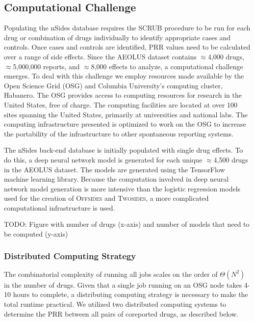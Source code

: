 \documentclass{ws-procs11x85}
\begin{document}
\subsection{Computational Challenge}

Populating the nSides database requires the SCRUB procedure to be run
for each drug or combination of drugs individually to identify
appropriate cases and controls. Once cases and controls are
identified, PRR values need to be calculated over a range of side
effects. Since the AEOLUS dataset contains $\approx$4,000 drugs,
$\approx$5,000,000 reports, and $\approx$8,000 effects to analyze, a
computational challenge emerges.  To deal with this challenge we
employ resources made available by the Open Science Grid (OSG) and
Columbia University's computing cluster, Habanero. The OSG provides
access to computing resources for research in the United States, free
of charge. The computing facilities are located at over 100 sites
spanning the United States, primarily at universities and national
labs.  The computing infrastructure presented is optimized to work on
the OSG to increase the portability of the infrastructure to other
spontaneous reporting systems.

The nSides back-end database is initially populated with single drug
effects. To do this, a deep neural network model is generated for each
unique $\approx$4,500 drugs in the AEOLUS dataset. The models are
generated using the TensorFlow machine learning library. Because the
computation involved in deep neural network model generation is more
intensive than the logistic regression models used for the creation of
O\textsc{ffsides} and T\textsc{wosides}, a more complicated
computational infrastructure is used.

TODO: Figure with number of drugs (x-axis) and number of models that need to be computed (y-axis)

\subsubsection{Distributed Computing Strategy}
The combinatorial complexity of running all jobs scales on the order
of $\Theta(N^2)$ in the number of drugs. Given that a single job
running on an OSG node takes 4-10 hours to complete, a distributing
computing strategy is necessary to make the total runtime
practical. We utilized two distributed computing systems to determine
the PRR between all pairs of coreported drugs, as described below.
\end{document}
